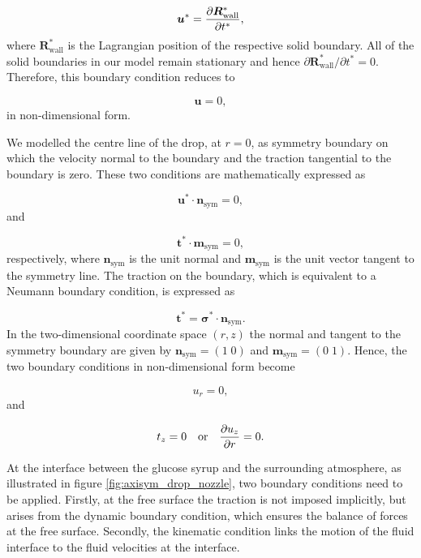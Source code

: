 \documentclass[aip,graphicx]{revtex4-1}
\newcommand{\sym}[1]{\text{#1}} \newcommand{\dif}{\mathrm{d}}
\newcommand{\vect}[1]{\bm{#1}}
\begin{document}
\begin{equation}
 \vect{u}^* = \pder[\vect{R}_{\sym{wall}}^*]{t^*},
 \label{eqn:ns_eqn_solid_wall_bc}
\end{equation}
where $\vect{R}_{\sym{wall}}^*$ is the Lagrangian position of the
respective solid boundary.  All of the solid boundaries in our model
remain stationary and hence $\partial \vect{R}_{\sym{wall}}^*/
\partial t^* = 0$.  Therefore, this boundary condition reduces to

\begin{equation}
 \vect{u} = 0,
 \label{eqn:ns_eqn_solid_wall_bc_non_dim}
\end{equation}
in non-dimensional form.

We modelled the centre line of the drop, at $r=0$, as symmetry
boundary on which the velocity normal to the boundary and the traction
tangential to the boundary is zero.  These two conditions are
mathematically expressed as

\begin{equation}
 \vect{u}^* \cdot \vect{n}_{\sym{sym}} = 0,
\end{equation}
and

\begin{equation}
 \vect{t}^* \cdot \vect{m}_{\sym{sym}} = 0,
\end{equation}
respectively, where $\vect{n}_{\sym{sym}}$ is the unit normal and
$\vect{m}_{\sym{sym}}$ is the unit vector tangent to the symmetry
line.  The traction on the boundary, which is equivalent to a Neumann
boundary condition, is expressed as

\begin{equation}
 \vect{t}^* = \vect{\sigma}^* \cdot \vect{n}_{\sym{sym}}.
 \label{eqn:ns_eqn_solid_wall_traction_bc}
\end{equation}
In the two-dimensional coordinate space $(r,z)$ the normal and tangent
to the symmetry boundary are given by $\vect{n}_{\sym{sym}}= (1 \; 0)$
and $\vect{m}_{\sym{sym}} = (0 \; 1)$.  Hence, the two boundary
conditions in non-dimensional form become

\begin{equation}
 u_r = 0,
 \label{eqn:ns_eqn_sym_bc_non_dim}
\end{equation}
and

\begin{equation}
 t_z = 0 \quad \text{or} \quad \pder[u_z]{r} = 0.
\end{equation}

At the interface between the glucose syrup and the surrounding
atmosphere, as illustrated in figure \ref{fig:axisym_drop_nozzle}, two
boundary conditions need to be applied.  Firstly, at the free surface
the traction is not imposed implicitly, but arises from the dynamic
boundary condition, which ensures the balance of forces at the free
surface.  Secondly, the kinematic condition links the motion of the
fluid interface to the fluid velocities at the interface.
\end{document}
